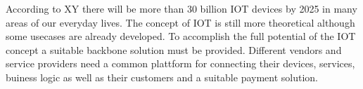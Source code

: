 \documentclass[
    ngerman,american
    ]{scrartcl}
\newcommand{\lang}{en}
\begin{document}
\begin{description}[style=unboxed]
            \item [\questionTwo{\lang}]
                According to XY there will be more than 30 billion IOT devices by 2025 in many areas of our everyday lives.
                The concept of IOT is still more theoretical although some usecases are already developed.
                To accomplish the full potential of the IOT concept a suitable backbone solution must be provided.
                Different vendors and service providers need a common plattform for connecting their devices, services, buiness logic as well as their customers and a suitable payment solution.



\end{description}
\end{document}
